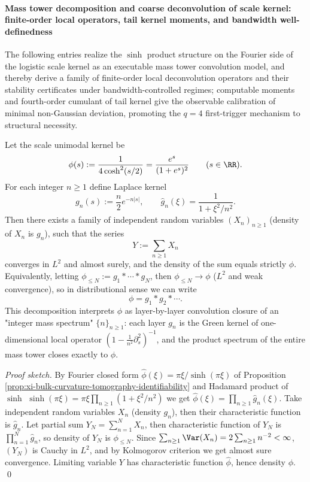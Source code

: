 
\paragraph{Mass tower decomposition and coarse deconvolution of scale kernel: finite-order local operators, tail kernel moments, and bandwidth well-definedness}
The following entries realize the \(\sinh\) product structure on the Fourier side of the logistic scale kernel as an executable mass tower convolution model,
and thereby derive a family of finite-order local deconvolution operators and their stability certificates under bandwidth-controlled regimes;
computable moments and fourth-order cumulant of tail kernel give the observable calibration of minimal non-Gaussian deviation, promoting the \(q=4\) first-trigger mechanism to structural necessity.

\begin{conclusion}\label{con:xi-terminal-scale-kernel-mass-tower-laplace}
Let the scale unimodal kernel be
\[
\phi(s):=\frac{1}{4\cosh^{2}(s/2)}=\frac{e^{s}}{(1+e^{s})^{2}}\qquad(s\in\RR).
\]
For each integer \(n\ge 1\) define Laplace kernel
\[
g_n(s):=\frac{n}{2}e^{-n|s|},
\qquad
\widehat g_n(\xi)=\frac{1}{1+\xi^{2}/n^{2}}.
\]
Then there exists a family of independent random variables \((X_n)_{n\ge 1}\) (density of \(X_n\) is \(g_n\)), such that the series
\[
Y:=\sum_{n\ge 1}X_n
\]
converges in \(L^{2}\) and almost surely, and the density of the sum equals strictly \(\phi\).
Equivalently, letting \(\phi_{\le N}:=g_1*\cdots*g_N\), then \(\phi_{\le N}\to\phi\) (\(L^2\) and weak convergence), so in distributional sense we can write
\[
\phi=g_1*g_2*\cdots .
\]
This decomposition interprets \(\phi\) as layer-by-layer convolution closure of an "integer mass spectrum" \(\{n\}_{n\ge 1}\): each layer \(g_n\) is the Green kernel of one-dimensional local operator \((1-\frac{1}{n^{2}}\partial_s^{2})^{-1}\), and the product spectrum of the entire mass tower closes exactly to \(\phi\).
\end{conclusion}
\begin{proof}[Proof sketch]
By Fourier closed form \(\widehat\phi(\xi)=\pi\xi/\sinh(\pi\xi)\) of Proposition \ref{prop:xi-bulk-curvature-tomography-identifiability} and Hadamard product of \(\sinh\)
\(
\sinh(\pi\xi)=\pi\xi\prod_{n\ge 1}(1+\xi^{2}/n^{2})
\)
we get
\(
\widehat\phi(\xi)=\prod_{n\ge 1}\widehat g_n(\xi)
\).
Take independent random variables \(X_n\) (density \(g_n\)), then their characteristic function is \(\widehat g_n\).
Let partial sum \(Y_N=\sum_{n=1}^{N}X_n\), then characteristic function of \(Y_N\) is \(\prod_{n=1}^{N}\widehat g_n\), so density of \(Y_N\) is \(\phi_{\le N}\).
Since \(\sum_{n\ge 1}\Var(X_n)=2\sum_{n\ge 1}n^{-2}<\infty\), \((Y_N)\) is Cauchy in \(L^2\), and by Kolmogorov criterion we get almost sure convergence.
Limiting variable \(Y\) has characteristic function \(\widehat\phi\), hence density \(\phi\). \qed
\end{proof}

